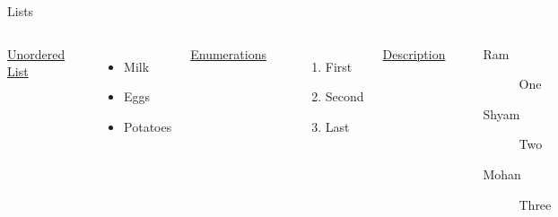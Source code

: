 \documentclass[10pt]{beamer}
\begin{document}
\begin{frame}[fragile]{Lists}  
  \begin{columns}[T,onlytextwidth]
  
		\underline{Unordered List}
        
\begin{verbatim}
\begin{itemize}
  \item Milk 
  \item Eggs 
  \item Potatoes
\end{itemize}\end{verbatim}
      
      \begin{itemize}
      \item Milk \item Eggs \item Potatoes
      \end{itemize}
      
    \underline{Enumerations}
    
\begin{verbatim}
\begin{enumerate}
  \item First 
  \item Second
  \item Last
\end{enumerate}\end{verbatim}

    \begin{enumerate}
    \item First \item Second \item Last
    \end{enumerate}

    \underline{Description}
    \begin{verbatim}
\begin{description}
  \item[Ram] One 
  \item[Shyam] Two
  \item[Mohan] Three
\end{description}\end{verbatim}

    \begin{description}
      \item[Ram] One 
      \item[Shyam] Two
      \item[Mohan] Three
    \end{description}
\end{columns}
\pause
{}
\end{frame}
\end{document}
